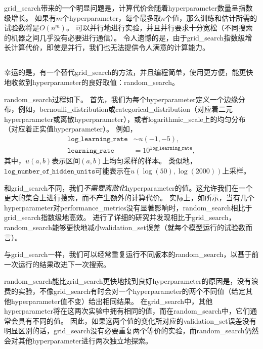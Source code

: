 \gls{grid_search}带来的一个明显问题是，计算代价会随着\gls{hyperparameter}数量呈指数级增长。
如果有$m$个\gls{hyperparameter}，每个最多取$n$个值，那么训练和估计所需的试验数将是$O(n^m)$。
可以并行地进行实验，并且并行要求十分宽松（不同搜索的机器之间几乎没有必要进行通信）。
令人遗憾的是，由于\gls{grid_search}指数级增长计算代价，即使是并行，我们也无法提供令人满意的计算能力。


\subsection{}
\label{sec:random_search}
幸运的是，有一个替代\gls{grid_search}的方法，并且编程简单，使用更方便，能更快地收敛到\gls{hyperparameter}的良好取值：\gls{random_search}\citep{Bergstra+Bengio-2012-small}。


\gls{random_search}过程如下。
首先，我们为每个\gls{hyperparameter}定义一个边缘分布，例如，\gls{bernoulli_distribution}或\gls{categorical_distribution}（对应着二元\gls{hyperparameter}或离散\gls{hyperparameter}），或者\gls{logarithmic_scale}上的均匀分布（对应着正实值\gls{hyperparameter}）。
例如，
\begin{align}
	\texttt{log\_learning\_rate} &\sim u(-1, -5), \\
	\texttt{learning\_rate} &= 10^{\texttt{log\_learning\_rate}},
\end{align}
其中，$u(a,b)$表示区间$(a,b)$上均匀采样的样本。
类似地，$\texttt{log\_number\_of\_hidden\_units}$可能表示在$u(\log(50), \log(2000))$上采样。


和\gls{grid_search}不同，我们\emph{不需要离散化}\gls{hyperparameter}的值。这允许我们在一个更大的集合上进行搜索，而不产生额外的计算代价。%
实际上，如所示，当有几个\gls{hyperparameter}对\gls{performance_metrics}没有显著影响时，\gls{random_search}相比于\gls{grid_search}指数级地高效。
\cite{Bergstra+Bengio-2012-small}进行了详细的研究并发现相比于\gls{grid_search}， \gls{random_search}能够更快地减小\gls{validation_set}误差（就每个模型运行的试验数而言）。

与\gls{grid_search}一样，我们可以经常重复运行不同版本的\gls{random_search}，以基于前一次运行的结果改进下一次搜索。


\gls{random_search}能比\gls{grid_search}更快地找到良好\gls{hyperparameter}的原因是，没有浪费的实验，不像\gls{grid_search}有时会对一个\gls{hyperparameter}的两个不同值（给定其他\gls{hyperparameter}值不变）给出相同结果。
在\gls{grid_search}中，其他\gls{hyperparameter}将在这两次实验中拥有相同的值，而在\gls{random_search}中，它们通常会具有不同的值。
因此，如果这两个值的变化所对应的\gls{validation_set}误差没有明显区别的话，\gls{grid_search}没有必要重复两个等价的实验，而\gls{random_search}仍然会对其他\gls{hyperparameter}进行两次独立地探索。


